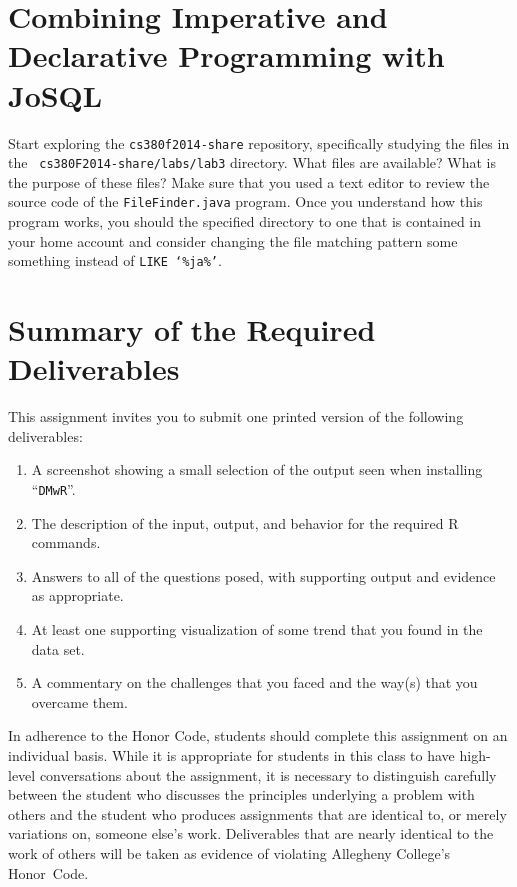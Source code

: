 \section*{Combining Imperative and Declarative Programming with JoSQL}

\begin{sloppypar}
Start exploring the {\tt cs380f2014-share} repository, specifically studying the files in the {\tt
  cs380F2014-share/labs/lab3} directory. What files are available? What is the purpose of these files? Make sure that
you used a text editor to review the source code of the {\tt FileFinder.java} program. Once you understand how this
program works, you should the specified directory to one that is contained in your home account and consider changing
the file matching pattern some something instead of {\tt LIKE `\%ja\%'}.
\end{sloppypar}

\section*{Summary of the Required Deliverables}

  This assignment invites you to submit one printed version of the following deliverables:

  \vspace*{-.05in}
  \begin{enumerate}
    \setlength{\itemsep}{0pt}
    \item A screenshot showing a small selection of the output seen when installing ``{\tt DMwR}''.
    \item The description of the input, output, and behavior for the required R commands.
    \item Answers to all of the questions posed, with supporting output and evidence as appropriate. 
    \item At least one supporting visualization of some trend that you found in the data set. 
    \item A commentary on the challenges that you faced and the way(s) that you overcame them.
  \end{enumerate}

\vspace*{-.1in} 

In adherence to the Honor Code, students should complete this assignment on an individual basis. While it is appropriate
for students in this class to have high-level conversations about the assignment, it is necessary to distinguish
carefully between the student who discusses the principles underlying a problem with others and the student who produces
assignments that are identical to, or merely variations on, someone else's work.  Deliverables that are nearly identical
to the work of others will be taken as evidence of violating Allegheny College's \mbox{Honor Code}.






